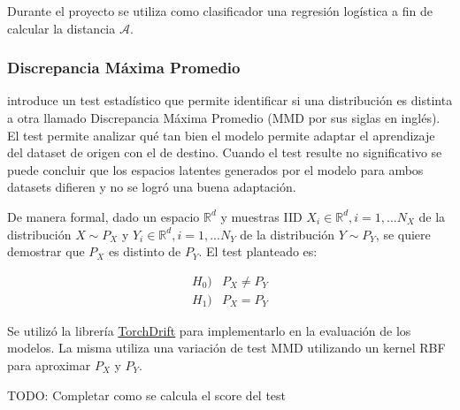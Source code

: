 Durante el proyecto se utiliza como clasificador una regresi\'on log\'istica a fin de calcular la distancia
$\mathcal{A}$.

\subsubsection{Discrepancia M\'axima Promedio}

\cite{gretton2012kernel} introduce un test estad\'istico que permite identificar si una distribuci\'on es distinta a
otra llamado Discrepancia M\'axima Promedio (MMD por sus siglas en ingl\'es). El test permite analizar qu\'e tan
bien el modelo permite adaptar el aprendizaje del dataset de origen con el de destino. Cuando el test resulte no
significativo se puede concluir que los espacios latentes generados por el modelo para ambos datasets difieren y no se
logr\'o una buena adaptaci\'on.

De manera formal, dado un espacio $\mathbb{R}^d$ y muestras IID $X_i \in \mathbb{R}^d, i=1,...N_X$ de la distribuci\'on
$X \sim P_X$ y $Y_i \in \mathbb{R}^d, i=1,...N_Y$ de la distribuci\'on $Y \sim P_Y$, se quiere demostrar que $P_X$ es
distinto de $P_Y$. El test planteado es:

\begin{align}
    H_0) & P_X \neq P_Y \nonumber \\
    H_1) & P_X = P_Y
\end{align}

Se utiliz\'o la librer\'ia \href{https://github.com/torchdrift/torchdrift/}{TorchDrift} para implementarlo en la
evaluaci\'on de los modelos. La misma utiliza una variaci\'on de test MMD utilizando un kernel RBF para aproximar $P_X$
y $P_Y$.

TODO: Completar como se calcula el score del test